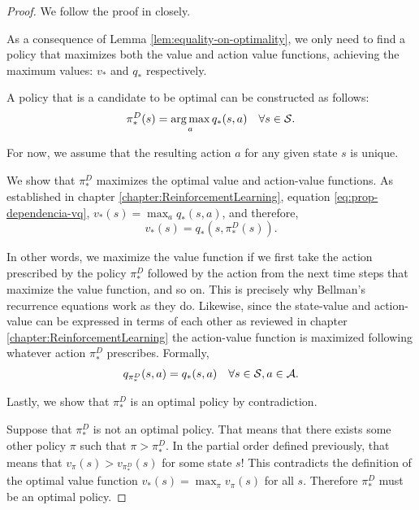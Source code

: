 \begin{proof}
    We follow the proof in \cite[pg.~115]{raoRL4F} closely.

    As a consequence of Lemma \ref{lem:equality-on-optimality}, we only need to
    find a policy that maximizes both the value and action value functions,
    achieving the maximum values: $v_*$ and $q_*$ respectively.

    A policy that is a candidate to be optimal can be constructed as follows:
    \begin{equation}
        \label{eq:greedy-policy-construction}
        \pi_{*}^{D} (s) = \operatorname*{arg\,max}_{a} q_{*} (s, a) \quad \forall s \in \mathcal{S}.
    \end{equation}

    For now, we assume that the resulting action $a$ for any given state $s$ is
    unique.

    We show that $\pi_{*}^{D}$ maximizes the optimal value and action-value
    functions. As established in chapter \ref{chapter:ReinforcementLearning},
    equation \eqref{eq:prop-dependencia-vq}, $v_* (s) = \max_a q_* (s, a)$, and
    therefore,
    \[
        v_* (s) = q_* (s, \pi_{*}^{D}(s)).
    \]

    In other words, we maximize the value function if we first take the action
    prescribed by the policy $\pi_{*}^{D}$ followed by the action from the next
    time steps that maximize the value function, and so on. This is precisely
    why Bellman's recurrence equations work as they do. Likewise, since the
    state-value and action-value can be expressed in terms of each other as
    reviewed in chapter \ref{chapter:ReinforcementLearning} the action-value
    function is maximized following whatever action $\pi_{*}^{D}$ prescribes.
    Formally,
    \[
        q_{\pi_{*}^{D}} (s, a) = q_* (s,a) \quad \forall s \in \mathcal{S}, a \in \mathcal{A}.
    \]

    Lastly, we show that $\pi_{*}^{D}$ is an optimal policy by contradiction.

    Suppose that $\pi_{*}^{D}$ is not an optimal policy. That means that there
    exists some other policy $\pi$ such that $\pi > \pi_{*}^{D}$. In the partial
    order defined previously, that means that $v_{\pi} (s) > v_{\pi_{*}^{D}}
    (s)$ for some state $s$! This contradicts the definition of the
    optimal value function $v_* (s) = \max_\pi v_\pi (s)$ for all $s$. Therefore
    $\pi_{*}^{D}$ must be an optimal policy.
\end{proof}

